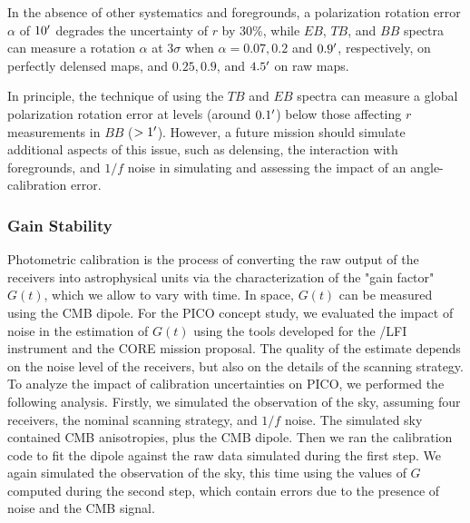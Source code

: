 \documentclass[PICOReport.tex]{subfiles}
\begin{document}
In the absence of other systematics and foregrounds, a polarization rotation error $\alpha$ of $10'$ degrades 
the uncertainty of $r$ by 30\%, while $EB$, $TB$, and $BB$ spectra can measure a rotation $\alpha$ at 3$\sigma$ when $\alpha = 0.07, 0.2$  and $0.9'$, respectively,
 on perfectly delensed maps, and $0.25, 0.9$, and $4.5'$ on raw maps.

In principle, the technique of using the $TB$ and $EB$ spectra can measure a global polarization rotation error at levels (around $0.1 '$) below those affecting $r$ measurements in $BB$ ($> 1 '$).  However, a future mission should simulate additional aspects of this issue, such as delensing, the interaction with foregrounds, and $1/f$ noise in simulating and assessing the impact of an angle-calibration error.

\subsubsection{Gain Stability}
\label{sec:gain}



Photometric calibration is the process of converting the raw output of the receivers into astrophysical units via the characterization of the "gain factor" $G(t)$, which we allow to vary with time.  In space, $G(t)$ can be measured using the CMB dipole.   For the PICO concept study, we evaluated the impact of noise in the estimation of $G(t)$ using the tools developed for the \planck/LFI instrument and the CORE mission proposal. The quality of the estimate depends on the noise level of the receivers, but also on the details of the scanning strategy. 
To analyze the impact of calibration uncertainties on PICO, we performed  the following analysis. Firstly, we simulated the observation of the sky, assuming four receivers, the nominal scanning strategy, and $1/f$ noise. The simulated sky contained CMB anisotropies, plus the CMB dipole. Then we ran the calibration code to fit the dipole against the raw data simulated during the first step. We again simulated the observation of the sky, this time using the values of $G$ computed during the second step, which contain errors due to the presence of noise and the CMB signal.
\end{document}
